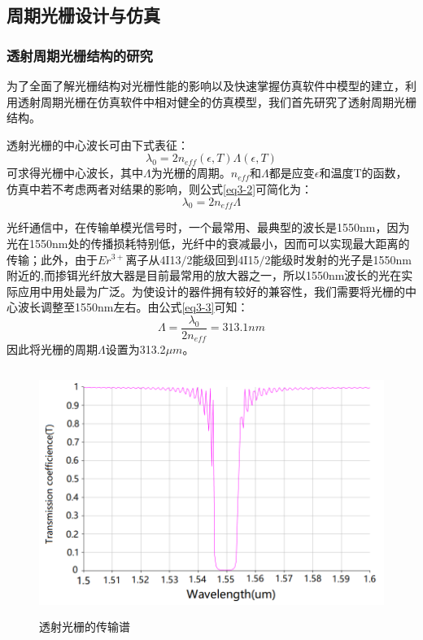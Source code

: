 \documentclass[UTF8,a4paper,12pt]{ctexart}
\numberwithin{equation}{section}
\begin{document}
\subsection{周期光栅设计与仿真}
\subsubsection{透射周期光栅结构的研究}
\label{sec3-3-1}
为了全面了解光栅结构对光栅性能的影响以及快速掌握仿真软件中模型的建立，利用透射周期光栅在仿真软件中相对健全的仿真模型，我们首先研究了透射周期光栅结构。

透射光栅的中心波长可由下式表征：
\begin{equation}
    \lambda_0 = 2n_{eff}(\epsilon,T)\Lambda(\epsilon,T) 
    \label{eq3-2}
\end{equation}
可求得光栅中心波长，其中$\Lambda$为光栅的周期。$n_{eff}$和$\Lambda$都是应变$\epsilon$和温度T的函数，仿真中若不考虑两者对结果的影响，则公式\ref{eq3-2}可简化为：
\begin{equation}
    \lambda_0 = 2n_{eff}\Lambda
    \label{eq3-3}
\end{equation}

光纤通信中，在传输单模光信号时，一个最常用、最典型的波长是1550nm，因为光在1550nm处的传播损耗特别低，光纤中的衰减最小，因而可以实现最大距离的传输；此外，由于$Er^{3+}$离子从4I13$/$2能级回到4I15$/$2能级时发射的光子是1550nm附近的,而掺铒光纤放大器是目前最常用的放大器之一，所以1550nm波长的光在实际应用中用处最为广泛。为使设计的器件拥有较好的兼容性，我们需要将光栅的中心波长调整至1550nm左右。由公式\ref{eq3-3}可知：
$$\Lambda = \frac{\lambda_0}{2n_{eff}} = 313.1nm$$ 
因此将光栅的周期$\Lambda$设置为313.2$\mu m$。

\begin{figure}[htbp]
\centering
\includegraphics[height=8cm,width=12cm]{fig6.png}
\caption{透射光栅的传输谱}
\label{3-6}
\end{figure}
\end{document}
